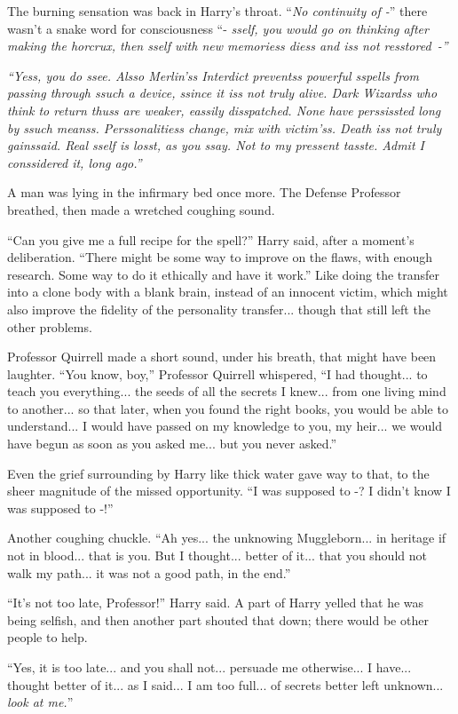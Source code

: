 The burning sensation was back in Harry's throat. ``\emph{No continuity of -}'' there wasn't a snake word for consciousness ``- \emph{sself, you would go on thinking after making the horcrux, then sself with new memoriess diess and iss not resstored~-''}

\emph{``Yess, you do ssee. Alsso Merlin'ss Interdict preventss powerful sspells from passing through ssuch a device, ssince it iss not truly alive. Dark Wizardss who think to return thuss are weaker, eassily disspatched. None have perssissted long by ssuch meanss. Perssonalitiess change, mix with victim'ss. Death iss not truly gainssaid. Real sself is losst, as you ssay. Not to my pressent tasste. Admit I conssidered it, long ago.''}

A man was lying in the infirmary bed once more. The Defense Professor breathed, then made a wretched coughing sound.

``Can you give me a full recipe for the spell?'' Harry said, after a moment's deliberation. ``There might be some way to improve on the flaws, with enough research. Some way to do it ethically and have it work.'' Like doing the transfer into a clone body with a blank brain, instead of an innocent victim, which might also improve the fidelity of the personality transfer... though that still left the other problems.

Professor Quirrell made a short sound, under his breath, that might have been laughter. ``You know, boy,'' Professor Quirrell whispered, ``I had thought... to teach you everything... the seeds of all the secrets I knew... from one living mind to another... so that later, when you found the right books, you would be able to understand... I would have passed on my knowledge to you, my heir... we would have begun as soon as you asked me... but you never asked.''

Even the grief surrounding by Harry like thick water gave way to that, to the sheer magnitude of the missed opportunity. ``I was supposed to -? I didn't know I was supposed to -!''

Another coughing chuckle. ``Ah yes... the unknowing Muggleborn... in heritage if not in blood... that is you. But I thought... better of it... that you should not walk my path... it was not a good path, in the end.''

``It's not too late, Professor!'' Harry said. A part of Harry yelled that he was being selfish, and then another part shouted that down; there would be other people to help.

``Yes, it is too late... and you shall not... persuade me otherwise... I have... thought better of it... as I said... I am too full... of secrets better left unknown... \emph{look at me.}''

